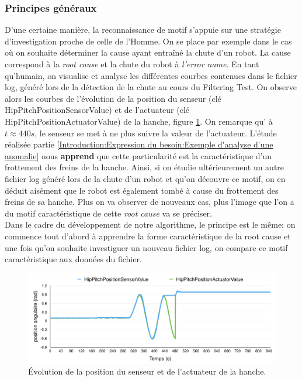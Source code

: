 \subsubsection{Principes généraux}
\label{Automatisation du processus d'investigation: Reconnaissance de motifs: Principes généraux}
D'une certaine manière, la reconnaissance de motif s'appuie sur une stratégie d'investigation proche de celle de l'Homme. On se place par exemple dans le cas où on souhaite déterminer la cause ayant entraîné la chute d'un robot. La cause correspond à la \emph{root cause} et la chute du robot à \emph{l'error name}. En tant qu'humain, on visualise et analyse les différentes courbes contenues dans le fichier log, généré lors de la détection de la chute au cours du Filtering Test. On observe alors les courbes de l'évolution de la position du senseur (clé HipPitchPositionSensorValue) et de l'actuateur (clé HipPitchPositionActuatorValue) de la hanche, figure \ref{fig:Évolution de la position du senseur et de l'actuateur de la hanche}. On remarque qu' à $t \approx 440 s$, le senseur se met à ne plus suivre la valeur de l'actuateur. L'étude réalisée partie \ref{Introduction:Expression du besoin:Exemple d'analyse d'une anomalie} nous \textbf{apprend} que cette particularité est la caractéristique d'un frottement des freins de la hanche. Ainsi, si on étudie ultérieurement un autre fichier log généré lors de la chute d'un robot et qu'on découvre ce motif, on en déduit aisément que le robot est également tombé à cause du frottement des freins de sa hanche. Plus on va observer de nouveaux cas, plus l'image que l'on a du motif caractéristique de cette \emph{root cause} va se préciser.\\
Dans le cadre du développement de notre algorithme, le principe est le même: on commence tout d'abord à apprendre la forme caractéristique de la root cause et une fois qu'on souhaite investiguer un nouveau fichier log, on compare ce motif caractéristique aux données du fichier. 

\begin{figure}[h]
	\centering\includegraphics[width=12cm]{images/HipPitch.png}
	\caption[Évolution de la position du senseur et de l'actuateur de la hanche]{Évolution de la position du senseur et de l'actuateur de la hanche.}
	\label{fig:Évolution de la position du senseur et de l'actuateur de la hanche}
\end{figure}

